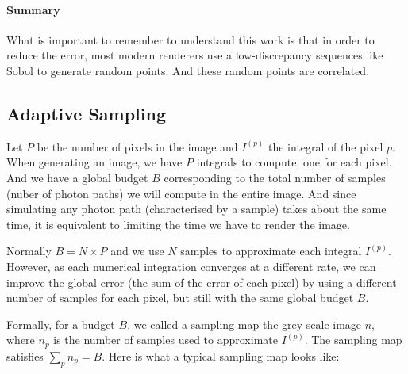 \documentclass{classeENS}
\begin{document}
\paragraph*{Summary} What is important to remember to understand this work 
is that in order to reduce the error, most modern renderers use a 
low-discrepancy sequences like Sobol \cite{renderman} to generate random points.
And these random points are correlated.

\subsection{Adaptive Sampling}

\par Let $P$ be the number of pixels in the image and $I^{(p)}$ the integral of 
the pixel $p$. When generating an image, we have $P$ integrals to compute, 
one for each pixel. And we have a global budget $B$ corresponding to the 
total number of samples (nuber of photon paths) we will compute in the entire 
image. And since simulating any photon path (characterised by a sample) takes about the 
same time, it is equivalent to limiting the time we have to render the image.

\par Normally $B=N\times P$ and we use $N$ samples to approximate each integral 
$I^{(p)}$. However, as each numerical integration converges at a different 
rate, we can improve the global error (the sum of the error of each pixel) 
by using a different number of samples for each pixel, but still with the same 
global budget $B$.

\par Formally, for a budget $B$, we called a sampling map the grey-scale 
image $n$, where $n_p$ is the number of samples used to approximate 
$I^{(p)}$. The sampling map satisfies $\sum_{p} n_p = B$. Here is what a 
typical sampling map looks like:
\end{document}
